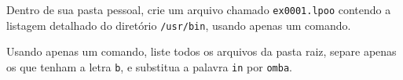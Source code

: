 \begin{Exercise}[label={0001}, difficulty=1]
  Dentro de sua pasta pessoal, crie um arquivo chamado \verb+ex0001.lpoo+
  contendo a listagem detalhado do diretório \verb+/usr/bin+, usando apenas um
  comando. 
\end{Exercise}
\begin{Exercise}[label={0002}, difficulty=2]
  Usando apenas um comando, liste todos os arquivos da pasta raiz, separe apenas
  os que tenham a letra \verb+b+, e substitua a palavra \verb+in+ por
  \verb+omba+.
\end{Exercise}
